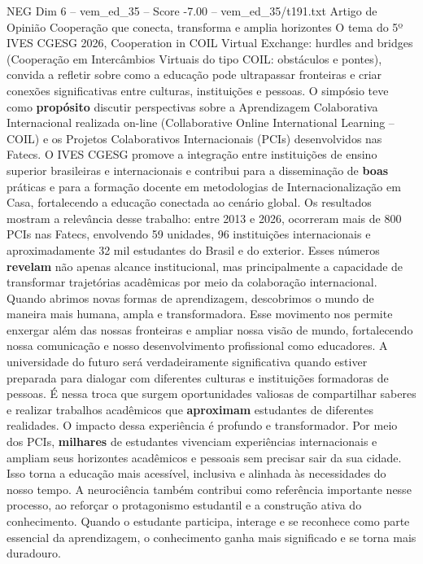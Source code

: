 \begin{textsample}{NEG Dim 6 – vem\_ed\_35 – Score -7.00 – vem\_ed\_35/t191.txt}  \label{ex:f6_neg_008}
Artigo de Opinião Cooperação que conecta, transforma e amplia horizontes O tema do 5º IVES CGESG 2026, Cooperation in COIL Virtual Exchange: hurdles and bridges (Cooperação em Intercâmbios Virtuais do tipo COIL: obstáculos e pontes), convida a refletir sobre como a educação pode ultrapassar fronteiras e criar conexões significativas entre culturas, instituições e pessoas.
O simpósio teve como \textbf{propósito} discutir perspectivas sobre a Aprendizagem Colaborativa Internacional realizada on-line (Collaborative Online International Learning – COIL) e os Projetos Colaborativos Internacionais (PCIs) desenvolvidos nas Fatecs.
O IVES CGESG promove a integração entre instituições de ensino superior brasileiras e internacionais e contribui para a disseminação de \textbf{boas} práticas e para a formação docente em metodologias de Internacionalização em Casa, fortalecendo a educação conectada ao cenário global.
Os resultados mostram a relevância desse trabalho: entre 2013 e 2026, ocorreram mais de 800 PCIs nas Fatecs, envolvendo 59 unidades, 96 instituições internacionais e aproximadamente 32 mil estudantes do Brasil e do exterior.
Esses números \textbf{revelam} não apenas alcance institucional, mas principalmente a capacidade de transformar trajetórias acadêmicas por meio da colaboração internacional.
Quando abrimos novas formas de aprendizagem, descobrimos o mundo de maneira mais humana, ampla e transformadora.
Esse movimento nos permite enxergar além das nossas fronteiras e ampliar nossa visão de mundo, fortalecendo nossa comunicação e nosso desenvolvimento profissional como educadores.
A universidade do futuro será verdadeiramente significativa quando estiver preparada para dialogar com diferentes culturas e instituições formadoras de pessoas.
É nessa troca que surgem oportunidades valiosas de compartilhar saberes e realizar trabalhos acadêmicos que \textbf{aproximam} estudantes de diferentes realidades.
O impacto dessa experiência é profundo e transformador.
Por meio dos PCIs, \textbf{milhares} de estudantes vivenciam experiências internacionais e ampliam seus horizontes acadêmicos e pessoais sem precisar sair da sua cidade.
Isso torna a educação mais acessível, inclusiva e alinhada às necessidades do nosso tempo.
A neurociência também contribui como referência importante nesse processo, ao reforçar o protagonismo estudantil e a construção ativa do conhecimento.
Quando o estudante participa, interage e se reconhece como parte essencial da aprendizagem, o conhecimento ganha mais significado e se torna mais duradouro.

\end{textsample}
